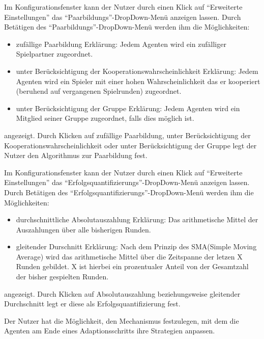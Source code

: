 \documentclass[parskip=full,11pt]{scrartcl}
\def\adapt{Adaptionsschritt}
\begin{document}
Im Konfigurationsfenster kann der Nutzer durch einen Klick auf \enquote{Erweiterte Einstellungen} das \enquote{Paarbildungs}-DropDown-Menü anzeigen lassen. Durch Betätigen des \enquote{Paarbildungs}-DropDown-Menü werden ihm die Möglichkeiten:\begin{itemize} \itemsep -10pt
\item zufällige Paarbildung
\newline Erklärung: Jedem Agenten wird ein zufälliger Spielpartner zugeordnet.
\item unter Berücksichtigung der Kooperationswahrscheinlichkeit
\newline Erklärung: Jedem Agenten wird ein Spieler mit einer hohen Wahrscheinlichkeit das er kooperiert (beruhend auf vergangenen Spielrunden) zugeordnet.
\item unter Berücksichtigung der Gruppe
\newline Erklärung: Jedem Agenten wird ein Mitglied seiner Gruppe zugeordnet, falls dies möglich ist.
\end{itemize}angezeigt. Durch Klicken auf zufällige Paarbildung, unter Berücksichtigung der Kooperationswahrscheinlichkeit oder unter Berücksichtigung der Gruppe legt der Nutzer den Algorithmus zur Paarbildung fest.


Im Konfigurationsfenster kann der Nutzer durch einen Klick auf \enquote{Erweiterte Einstellungen} das \enquote{Erfolgsquantifizierungs}-DropDown-Menü anzeigen lassen. Durch Betätigen des \enquote{Erfolgsquantifizierungs}-DropDown-Menü werden ihm die Möglichkeiten:\begin{itemize} \itemsep -10pt
\item durchschnittliche Absolutauszahlung
\newline Erklärung: Das arithmetische Mittel der Auszahlungen über alle bisherigen Runden.
\item gleitender Durschnitt
\newline Erklärung: Nach dem Prinzip des SMA(Simple Moving Average) wird das arithmetische Mittel über die Zeitspanne der letzen X Runden gebildet. X ist hierbei ein prozentualer Anteil von der Gesamtzahl der bisher gespielten Runden.
\end{itemize}angezeigt. Durch Klicken auf Absolutauszahlung beziehungsweise gleitender Durchschnitt legt er diese als Erfolgsquantifizierung fest.

Der Nutzer hat die Möglichkeit, den Mechanismus festzulegen, mit dem die Agenten am Ende eines \adapt s ihre Strategien anpassen.
\end{document}
